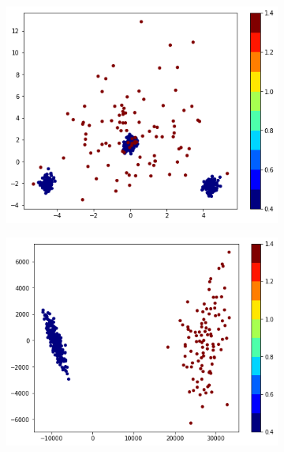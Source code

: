 \documentclass[11pt]{article}
\begin{document}
\begin{figure}[h]
	\centering
	\begin{subfigure}{0.45\textwidth}
		\centering
		\includegraphics[width=\textwidth]{XY_images/pca_rawanglediffs.png}
	\end{subfigure}\hfill
	\begin{subfigure}{0.45\textwidth}
		\centering
		\includegraphics[width=\textwidth]{XY_images/pca_perIms.png}
	\end{subfigure}
\end{figure}
\end{document}
